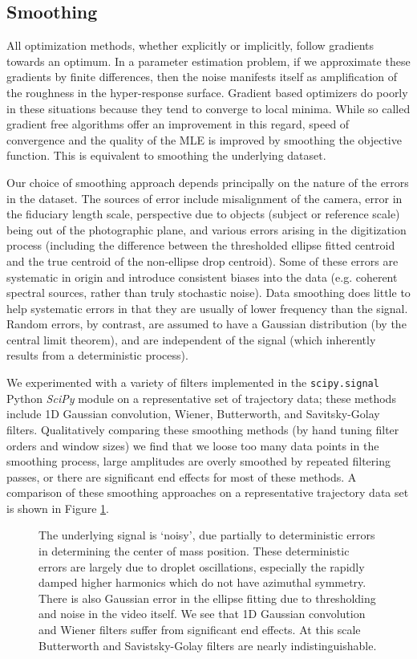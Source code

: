 \documentclass[12pt,a4paper,oneside]{book}
\begin{document}
\subsection{Smoothing}
All optimization methods, whether explicitly or implicitly, follow gradients towards an optimum. In a parameter estimation problem, if we approximate these gradients by finite differences, then the noise manifests itself as amplification of the roughness in the hyper-response surface. Gradient based optimizers do poorly in these situations because they tend to converge to local minima. While so called gradient free algorithms offer an improvement in this regard, speed of convergence and the quality of the MLE is improved by smoothing the objective function. This is equivalent to smoothing the underlying dataset.

Our choice of smoothing approach depends principally on the nature of the errors in the dataset. The sources of error include misalignment of the camera, error in the fiduciary length scale, perspective due to objects (subject or reference scale) being out of the photographic plane, and various errors arising in the digitization process (including the difference between the thresholded ellipse fitted centroid and the true centroid of the non-ellipse drop centroid). Some of these errors are systematic in origin and introduce consistent biases into the data (e.g. coherent spectral sources, rather than truly stochastic noise). Data smoothing does little to help systematic errors in that they are usually of lower frequency than the signal. Random errors, by contrast, are assumed to have a Gaussian distribution (by the central limit theorem), and are independent of the signal (which inherently results from a deterministic process).

We experimented with a variety of filters implemented in the \verb|scipy.signal| Python \emph{SciPy} \cite{oliphant_python_2007} module on a representative set of trajectory data; these methods include 1D Gaussian convolution, Wiener, Butterworth, and Savitsky-Golay filters. Qualitatively comparing these smoothing methods (by hand tuning filter orders and window sizes) we find that we loose too many data points in the smoothing process, large amplitudes are overly smoothed by repeated filtering passes, or there are significant end effects for most of these methods. A comparison of these smoothing approaches on a representative trajectory data set is shown in Figure \ref{fig:y_filtered}.
\begin{figure}
    \centering
    
       \caption{The underlying signal is `noisy', due partially to deterministic errors in determining the center of mass position. These deterministic errors are largely due to droplet oscillations, especially the rapidly damped higher harmonics which do not have azimuthal symmetry. There is also Gaussian error in the ellipse fitting due to thresholding and noise in the video itself. We see that 1D Gaussian convolution and Wiener filters suffer from significant end effects. At this scale Butterworth and Savistsky-Golay filters are nearly indistinguishable.}
      \label{fig:y_filtered}
\end{figure}
\end{document}
